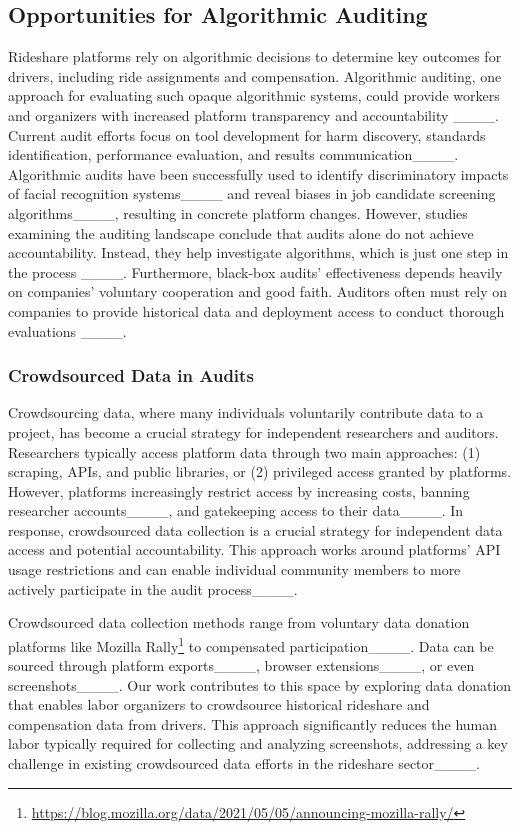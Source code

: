 \subsection{Opportunities for Algorithmic Auditing}
Rideshare platforms rely on algorithmic decisions to determine key outcomes for drivers, including ride assignments and compensation. Algorithmic auditing, one approach for evaluating such opaque algorithmic systems, could provide workers and organizers with increased platform transparency and accountability ____. Current audit efforts focus on tool development for harm discovery, standards identification, performance evaluation, and results communication____. Algorithmic audits have been successfully used to identify discriminatory impacts of facial recognition systems____ and reveal biases in job candidate screening algorithms____, resulting in concrete platform changes. However, studies examining the auditing landscape conclude that audits alone do not achieve accountability. Instead, they help investigate algorithms, which is just one step in the process ____. Furthermore, black-box audits' effectiveness depends heavily on companies' voluntary cooperation and good faith. Auditors often must rely on companies to provide historical data and deployment access to conduct thorough evaluations ____.

\subsubsection{Crowdsourced Data in Audits}

Crowdsourcing data, where many individuals voluntarily contribute data to a project, has become a crucial strategy for independent researchers and auditors. Researchers typically access platform data through two main approaches: (1) scraping, APIs, and public libraries, or (2) privileged access granted by platforms. However, platforms increasingly restrict access by increasing costs, banning researcher accounts____, and gatekeeping access to their data____. In response, crowdsourced data collection is a crucial strategy for independent data access and potential accountability. This approach works around platforms' API usage restrictions and can enable individual community members to more actively participate in the audit process____.

Crowdsourced data collection methods range from voluntary data donation platforms like Mozilla Rally\footnote{\url{https://blog.mozilla.org/data/2021/05/05/announcing-mozilla-rally/}} to compensated participation____. Data can be sourced through platform exports____, browser extensions____, or even screenshots____. 
Our work contributes to this space by %
exploring data donation that enables labor organizers to crowdsource historical rideshare and compensation data from drivers. This approach significantly reduces the human labor typically required for collecting and analyzing screenshots, addressing a key challenge in existing crowdsourced data efforts in the rideshare sector____. 

